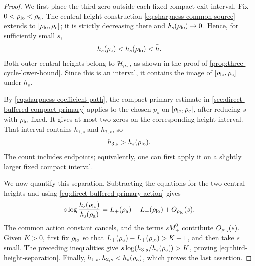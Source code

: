 \begin{proof}
We first place the third zero outside each fixed compact exit interval.
Fix \(0<\rho_{\rm lo}<\rho_{\rm a}\). The central-height construction
\eqref{eq:sharpness-common-source} extends to
\([\rho_{\rm lo},\rho_{\rm c}]\); it is strictly decreasing there and
\(h_s(\rho_{\rm lo})\to0\). Hence, for sufficiently small \(s\),
\[
 h_s(\rho_{\rm c})<h_s(\rho_{\rm lo})<\bar h.
\]
Both outer central heights belong to \(\mathcal H_{p_s}\), as shown in the
proof of \cref{prop:three-cycle-lower-bound}. Since this is an interval,
it contains the image of \([\rho_{\rm lo},\rho_{\rm c}]\) under \(h_s\).

By \eqref{eq:sharpness-coefficient-path}, the compact-primary estimate
in \cref{sec:direct-buffered-compact-primary} applies to the chosen
\(p_s\) on \([\rho_{\rm lo},\rho_{\rm c}]\), after reducing \(s\)
with \(\rho_{\rm lo}\) fixed. It gives at most two zeros on the
corresponding height interval. That interval contains \(h_{1,s}\)
and \(h_{2,s}\), so
\[
 h_{3,s}>h_s(\rho_{\rm lo}).
\]
The count includes endpoints; equivalently, one can first apply it
on a slightly larger fixed compact interval.

We now quantify this separation. Subtracting the equations for the
two central heights and using
\eqref{eq:direct-buffered-primary-action} gives
\[
 s\log\frac{h_s(\rho_{\rm lo})}{h_s(\rho_{\rm a})}
  =L_+(\rho_{\rm a})-L_+(\rho_{\rm lo})+O_{\rho_{\rm lo}}(s).
\]
The common action constant cancels, and the terms \(sM_+^0\)
contribute \(O_{\rho_{\rm lo}}(s)\). Given \(K>0\), first fix
\(\rho_{\rm lo}\) so that
\(L_+(\rho_{\rm a})-L_+(\rho_{\rm lo})>K+1\), and then take \(s\)
small. The preceding inequalities give
\(s\log(h_{3,s}/h_s(\rho_{\rm a}))>K\), proving
\eqref{eq:third-height-separation}. Finally,
\(h_{1,s},h_{2,s}<h_s(\rho_{\rm a})\), which proves the last assertion.
\end{proof}

